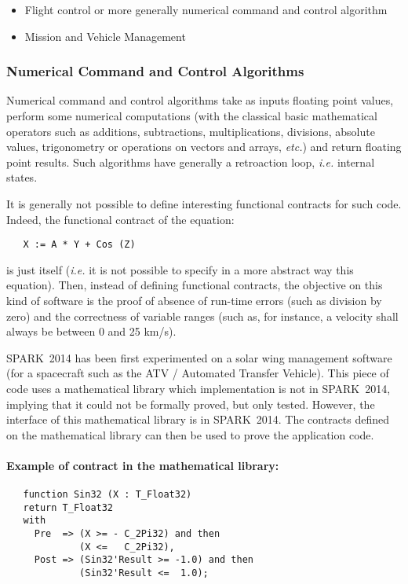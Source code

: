 \documentclass[10pt,a4paper,twocolumn]{article}
\newcommand{\newspark}{SPARK~2014\xspace}
\newcommand{\etc}{\textit{etc.}\xspace}
\newcommand{\ie}{\textit{i.e.}\xspace}
\begin{document}
\begin{itemize}
\item Flight control or more generally numerical command and control algorithm
\item Mission and Vehicle Management
\end{itemize}

\subsubsection{Numerical Command and Control Algorithms}

Numerical command and control algorithms take as inputs floating point values,
perform some numerical computations (with the classical basic mathematical
operators such as additions, subtractions, multiplications, divisions, absolute
values, trigonometry or operations on vectors and arrays, \etc) and return
floating point results. Such algorithms have generally a retroaction loop, \ie
internal states.

It is generally not possible to define interesting functional contracts for
such code. Indeed, the functional contract of the equation:

\begin{lstlisting}
   X := A * Y + Cos (Z)
\end{lstlisting}

\noindent
is just itself (\ie it is not possible to specify in a more abstract way this
equation). Then, instead of defining functional contracts, the objective on
this kind of software is the proof of absence of run-time errors (such as
division by zero) and the correctness of variable ranges (such as, for
instance, a velocity shall always be between 0 and 25 km/s).

\newspark has been first experimented on a solar wing management software (for a spacecraft such as the ATV / Automated Transfer Vehicle).
This piece of code uses a mathematical library which implementation is not in \newspark, implying that it could not be formally proved, but only tested. However, the interface of this mathematical library is in \newspark. The contracts defined on the mathematical library can then be used to prove the application code.

\paragraph{Example of contract in the mathematical library:}

\begin{lstlisting}
   function Sin32 (X : T_Float32)
   return T_Float32
   with
     Pre  => (X >= - C_2Pi32) and then
             (X <=   C_2Pi32),
     Post => (Sin32'Result >= -1.0) and then
             (Sin32'Result <=  1.0);
\end{lstlisting}
\end{document}
